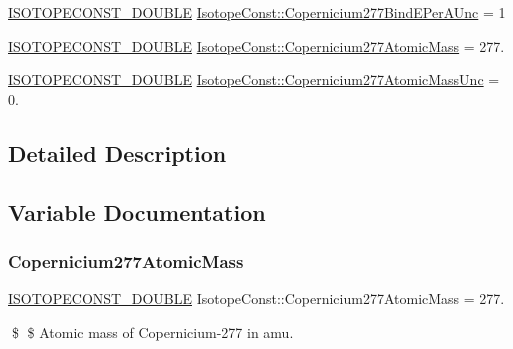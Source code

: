 \begin{DoxyCompactItemize}
\item 
\mbox{\hyperlink{group___isotope_const-_macros_ga8f45a7272ce02c0b4c65c44636ed719a}{I\+S\+O\+T\+O\+P\+E\+C\+O\+N\+S\+T\+\_\+\+D\+O\+U\+B\+LE}} \mbox{\hyperlink{group___isotope_const-_copernicium-_cn277_gaaa82ad4e6531b01892d9d83a22883784}{Isotope\+Const\+::\+Copernicium277\+Bind\+E\+Per\+A\+Unc}} = 1
\item 
\mbox{\hyperlink{group___isotope_const-_macros_ga8f45a7272ce02c0b4c65c44636ed719a}{I\+S\+O\+T\+O\+P\+E\+C\+O\+N\+S\+T\+\_\+\+D\+O\+U\+B\+LE}} \mbox{\hyperlink{group___isotope_const-_copernicium-_cn277_ga7668d0a385c67b468385f721292c0521}{Isotope\+Const\+::\+Copernicium277\+Atomic\+Mass}} = 277.
\item 
\mbox{\hyperlink{group___isotope_const-_macros_ga8f45a7272ce02c0b4c65c44636ed719a}{I\+S\+O\+T\+O\+P\+E\+C\+O\+N\+S\+T\+\_\+\+D\+O\+U\+B\+LE}} \mbox{\hyperlink{group___isotope_const-_copernicium-_cn277_ga3c34857d59b7b74cf772e7b612d03084}{Isotope\+Const\+::\+Copernicium277\+Atomic\+Mass\+Unc}} = 0.
\end{DoxyCompactItemize}


\subsection{Detailed Description}


\subsection{Variable Documentation}
\mbox{\label{group___isotope_const-_copernicium-_cn277_ga7668d0a385c67b468385f721292c0521}} 
\subsubsection{\texorpdfstring{Copernicium277\+Atomic\+Mass}{Copernicium277AtomicMass}}
{\footnotesize\ttfamily \mbox{\hyperlink{group___isotope_const-_macros_ga8f45a7272ce02c0b4c65c44636ed719a}{I\+S\+O\+T\+O\+P\+E\+C\+O\+N\+S\+T\+\_\+\+D\+O\+U\+B\+LE}} Isotope\+Const\+::\+Copernicium277\+Atomic\+Mass = 277.}

\$ \$ Atomic mass of Copernicium-\/277 in amu. \mbox{\label{group___isotope_const-_copernicium-_cn277_ga3c34857d59b7b74cf772e7b612d03084}} 
